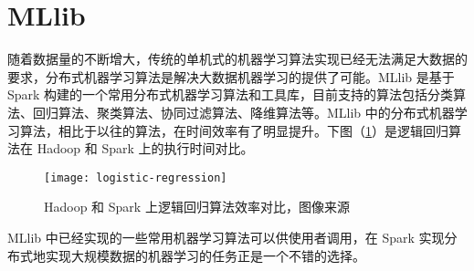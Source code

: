 \section{MLlib}
随着数据量的不断增大，传统的单机式的机器学习算法实现已经无法满足大数据的要求，分布式机器学习算法是解决大数据机器学习的提供了可能。MLlib 是基于 Spark 构建的一个常用分布式机器学习算法和工具库，目前支持的算法包括分类算法、回归算法、聚类算法、协同过滤算法、降维算法等。MLlib 中的分布式机器学习算法，相比于以往的算法，在时间效率有了明显提升。下图（\ref{fig:logistic-regression}）是逻辑回归算法在 Hadoop 和 Spark 上的执行时间对比。
\begin{figure}[H]
  \centering
  \texttt{[image: logistic-regression]}
  \caption{Hadoop 和 Spark 上逻辑回归算法效率对比，图像来源\protect\footnotemark}
  \label{fig:logistic-regression}
\end{figure}
MLlib 中已经实现的一些常用机器学习算法可以供使用者调用，在 Spark 实现分布式地实现大规模数据的机器学习的任务正是一个不错的选择。

